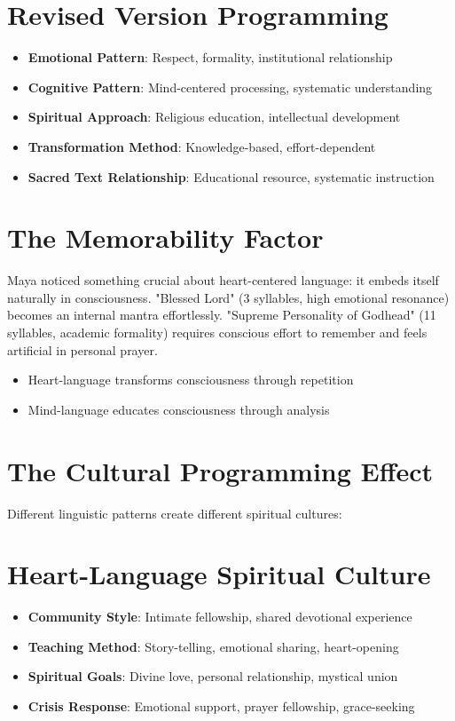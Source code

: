 \documentclass[11pt,twoside]{book}
\begin{document}
\section*{Revised Version Programming}
\label{sec:orgfe345f3}
\begin{itemize}
\item \textbf{\textbf{Emotional Pattern}}: Respect, formality, institutional relationship
\item \textbf{\textbf{Cognitive Pattern}}: Mind-centered processing, systematic understanding
\item \textbf{\textbf{Spiritual Approach}}: Religious education, intellectual development
\item \textbf{\textbf{Transformation Method}}: Knowledge-based, effort-dependent
\item \textbf{\textbf{Sacred Text Relationship}}: Educational resource, systematic instruction
\end{itemize}
\section*{The Memorability Factor}
\label{sec:orge15945b}

Maya noticed something crucial about heart-centered language: it embeds itself naturally in consciousness. "Blessed Lord" (3 syllables, high emotional resonance) becomes an internal mantra effortlessly. "Supreme Personality of Godhead" (11 syllables, academic formality) requires conscious effort to remember and feels artificial in personal prayer.
\begin{itemize}
\item Heart-language transforms consciousness through repetition
\item Mind-language educates consciousness through analysis
\end{itemize}
\section*{The Cultural Programming Effect}
\label{sec:org085349e}

Different linguistic patterns create different spiritual cultures:
\section*{Heart-Language Spiritual Culture}
\label{sec:orge77b41f}
\begin{itemize}
\item \textbf{\textbf{Community Style}}: Intimate fellowship, shared devotional experience
\item \textbf{\textbf{Teaching Method}}: Story-telling, emotional sharing, heart-opening
\item \textbf{\textbf{Spiritual Goals}}: Divine love, personal relationship, mystical union
\item \textbf{\textbf{Crisis Response}}: Emotional support, prayer fellowship, grace-seeking
\end{itemize}
\end{document}
